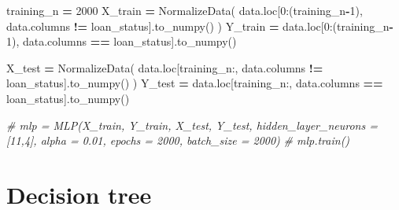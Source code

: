 \documentclass[
]{book}
\newenvironment{Shaded}{\begin{snugshade}}{\end{snugshade}}
\newcommand{\CommentTok}[1]{\textcolor[rgb]{0.56,0.35,0.01}{\textit{#1}}}
\newcommand{\DecValTok}[1]{\textcolor[rgb]{0.00,0.00,0.81}{#1}}
\newcommand{\NormalTok}[1]{#1}
\newcommand{\OperatorTok}[1]{\textcolor[rgb]{0.81,0.36,0.00}{\textbf{#1}}}
\newcommand{\StringTok}[1]{\textcolor[rgb]{0.31,0.60,0.02}{#1}}
\begin{document}
\begin{Shaded}
\begin{Highlighting}[]
\NormalTok{training\_n }\OperatorTok{=} \DecValTok{2000}
\NormalTok{X\_train }\OperatorTok{=}\NormalTok{ NormalizeData( data.loc[}\DecValTok{0}\NormalTok{:(training\_n}\OperatorTok{{-}}\DecValTok{1}\NormalTok{), data.columns }\OperatorTok{!=} \StringTok{\textquotesingle{}loan\_status\textquotesingle{}}\NormalTok{].to\_numpy() )}
\NormalTok{Y\_train }\OperatorTok{=}\NormalTok{ data.loc[}\DecValTok{0}\NormalTok{:(training\_n}\OperatorTok{{-}}\DecValTok{1}\NormalTok{), data.columns }\OperatorTok{==} \StringTok{\textquotesingle{}loan\_status\textquotesingle{}}\NormalTok{].to\_numpy()}

\NormalTok{X\_test }\OperatorTok{=}\NormalTok{ NormalizeData( data.loc[training\_n:, data.columns }\OperatorTok{!=} \StringTok{\textquotesingle{}loan\_status\textquotesingle{}}\NormalTok{].to\_numpy() )}
\NormalTok{Y\_test }\OperatorTok{=}\NormalTok{ data.loc[training\_n:, data.columns }\OperatorTok{==} \StringTok{\textquotesingle{}loan\_status\textquotesingle{}}\NormalTok{].to\_numpy()}


\CommentTok{\# mlp = MLP(X\_train, Y\_train, X\_test, Y\_test, hidden\_layer\_neurons = [11,4], alpha = 0.01, epochs = 2000, batch\_size = 2000)}
\CommentTok{\# mlp.train()}
\end{Highlighting}
\end{Shaded}

\hypertarget{decision-tree}{%
\chapter{Decision tree}\label{decision-tree}}
\end{document}
